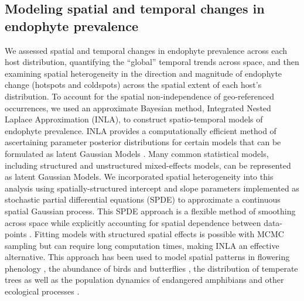 \documentclass[11pt]{article}
\let\cite\citep
\newcommand{\tom}[2]{{\color{red}{#1}}\footnote{\textit{\color{red}{#2}}}}
\newcommand{\revise}[1]{{\color{black}{#1}}}
\begin{document}
\subsection*{Modeling spatial and temporal changes in endophyte prevalence}
We assessed spatial and temporal changes in endophyte prevalence across each host distribution, quantifying the ``global'' temporal trends \linelabel{R2C27-begin}\revise{averaged} across space, and then examining spatial heterogeneity in the direction and magnitude of endophyte change (hotspots and coldspots) across the spatial extent of each host's distribution.
To account for the spatial non-independence of geo-referenced occurrences, we used an approximate Bayesian method, Integrated Nested Laplace Approximation (INLA), to construct spatio-temporal models of endophyte prevalence.
INLA provides a computationally efficient method of ascertaining parameter posterior distributions for certain models that can be formulated as latent Gaussian Models \cite{rue2009approximate}.
Many common statistical models, including structured and unstructured mixed-effects models, can be represented as latent Gaussian Models.
We incorporated spatial heterogeneity into this analysis using spatially-structured intercept and slope parameters implemented as stochastic partial differential equations (SPDE) to approximate a continuous spatial Gaussian process. 
This SPDE approach is a flexible method of smoothing across space while explicitly accounting for spatial dependence between data-points \citep{lindgren2011explicit,bakka2018spatial}.
Fitting models with structured spatial effects is possible with MCMC sampling but can require long computation times, making INLA an effective alternative. 
This approach has been used to model spatial patterns in flowering phenology \cite{willems2022forest}, the abundance of birds \cite{meehan2019spatial} and butterflies \cite{crossley2022opposing}, the distribution of temperate trees \cite{engel2022spatial} as well as the population dynamics of endangered amphibians \cite{knapp2016large} and other ecological processes \cite{beguin2012hierarchical}.
\end{document}
